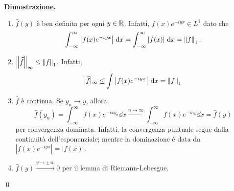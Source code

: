 \textbf{Dimostrazione.} 
\begin{enumerate}

	\item $\hat{f}(y)$ è ben definita per ogni $y \in \mathbb R$. Infatti, $f(x) e^{-iyx} \in L^1$ dato che
	$$
		\int_{-\infty}^\infty \left| f(x) e^{-iyx} \right| \,\mathrm{d} x 
		= \int_{-\infty}^\infty \left| f(x) \right| \,\mathrm{d} x
		= \left\lVert f \right\rVert_1.
	$$


	\item $\left\lVert \widehat{f} \right\rVert_\infty \leq \left\lVert f \right\rVert_1$. Infatti,
	$$
		|\widehat{f}|_\infty \leq \int \left| f(x) e^{-iyx} \right| \,\mathrm{d} x = \left\lVert f \right\rVert_1
	$$


	\item $\hat{f}$ è continua. Se $y_n \to y$, allora
	$$
		\hat{f}(y_n) = \int_{-\infty}^\infty f(x) e^{-ixy_n} \dd x \xrightarrow{n \to \infty}
		\int_{-\infty}^\infty f(x) e^{-iny} \dd x = \hat{f}(y)
	$$
	per convergenza dominata. Infatti, la convergenza puntuale segue dalla continuità dell'esponenziale; mentre la dominazione è data da $|f(x) e^{-iyx}| = |f(x)|$.


	\item $\hat{f}(y) \xrightarrow{y \to \pm \infty} 0$ per il lemma di Riemann-Lebesgue.

\end{enumerate}
\qed

